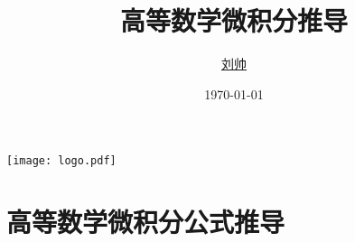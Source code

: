 \documentclass[cn,pad,11pt,green,geye]{elegantnote}
\title{高等数学微积分推导}
\author{\href{https://blog.csdn.net/bleedingfight}{刘帅}}
\institute{\href{https://blog.csdn.net/bleedingfight}{微积分公式推导}}
\date{\today}
\begin{document}
\maketitle
\centerline{\texttt{[image: logo.pdf]}}


\section{高等数学微积分公式推导}


\end{document}
